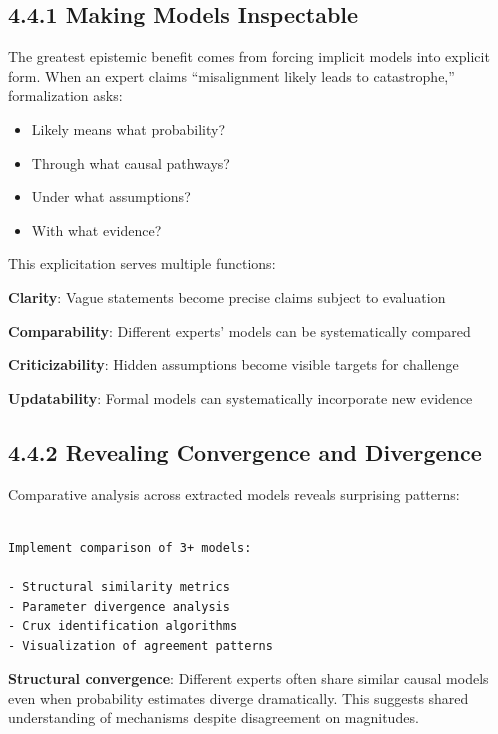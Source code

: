 \documentclass[
  11pt,
  letterpaper,
]{book}
\providecommand{\tightlist}{%
  \setlength{\itemsep}{0pt}\setlength{\parskip}{0pt}}
\begin{document}
\subsection*{4.4.1 Making Models
Inspectable}\label{sec-inspectable-models}

The greatest epistemic benefit comes from forcing implicit models into
explicit form. When an expert claims ``misalignment likely leads to
catastrophe,'' formalization asks:

\begin{itemize}
\tightlist
\item
  Likely means what probability?
\item
  Through what causal pathways?
\item
  Under what assumptions?
\item
  With what evidence?
\end{itemize}

This explicitation serves multiple functions:

\textbf{Clarity}: Vague statements become precise claims subject to
evaluation

\textbf{Comparability}: Different experts' models can be systematically
compared

\textbf{Criticizability}: Hidden assumptions become visible targets for
challenge

\textbf{Updatability}: Formal models can systematically incorporate new
evidence

\subsection*{4.4.2 Revealing Convergence and
Divergence}\label{sec-convergence-divergence}

Comparative analysis across extracted models reveals surprising
patterns:

\begin{verbatim}

Implement comparison of 3+ models:

- Structural similarity metrics
- Parameter divergence analysis
- Crux identification algorithms
- Visualization of agreement patterns
\end{verbatim}

\textbf{Structural convergence}: Different experts often share similar
causal models even when probability estimates diverge dramatically. This
suggests shared understanding of mechanisms despite disagreement on
magnitudes.
\end{document}
